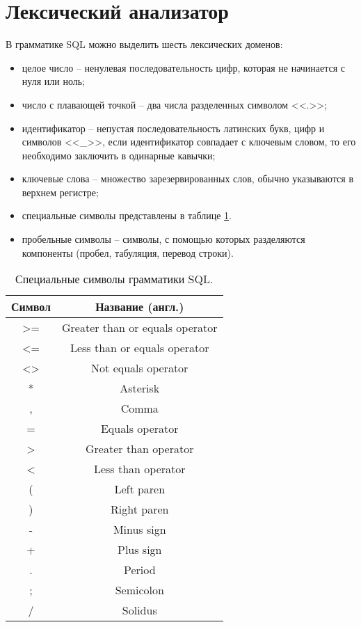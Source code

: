 \section{Лексический анализатор}

В грамматике SQL можно выделить шесть лексических доменов:
\begin{itemize}
	\item целое число -- ненулевая последовательность цифр, которая не начинается с нуля или ноль;
	\item число с плавающей точкой -- два числа разделенных символом <<.>>;
	\item идентификатор -- непустая последовательность латинских букв, цифр и символов <<\_>>, если идентификатор совпадает с ключевым словом, то его необходимо заключить в одинарные кавычки; 
	\item ключевые слова -- множество зарезервированных слов, обычно указываются в верхнем регистре;
	\item специальные символы представлены в таблице \ref{tbl:specsim}.
	\item пробельные символы -- символы, с помощью которых разделяются компоненты (пробел, табуляция, перевод строки).
\end{itemize}



\begin{table}[!h]
	\begin{center}
		\captionsetup{justification=raggedleft,singlelinecheck=off}
		\caption{Специальные символы грамматики SQL.}
		\label{tbl:specsim}
		\begin{tabular}{|c|c|}
			\hline
			\textbf{Символ} & \textbf{Название (англ.)} \\
			\hline
			>= & Greater than or equals operator \\
			\hline
			<= & Less than or equals operator \\
			\hline
			<> & Not equals operator \\
			\hline
			* & Asterisk \\
			\hline
			, & Comma \\
			\hline
			= & Equals operator \\
			\hline
			> & Greater than operator \\
			\hline
			< & Less than operator \\
			\hline
			( & Left paren \\
			\hline
			)& Right paren \\
			\hline
			- & Minus sign \\
			\hline
			+ & Plus sign \\
			\hline
			. & Period \\
			\hline
			; & Semicolon \\
			\hline
			/ & Solidus \\
			\hline
		\end{tabular}
	\end{center}
	
\end{table}

